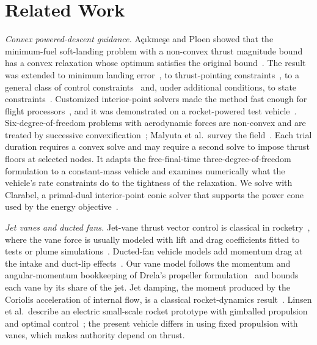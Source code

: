 \documentclass[10pt,letterpaper]{article}
\begin{document}
\section{Related Work}
\label{sec:related}

\textit{Convex powered-descent guidance.}
A\c{c}{\i}kme\c{s}e and Ploen showed that the minimum-fuel soft-landing problem with a non-convex thrust magnitude bound has a convex relaxation whose optimum satisfies the original bound~\cite{acikmese2007}.
The result was extended to minimum landing error~\cite{blackmore2010mle}, to thrust-pointing constraints~\cite{acikmese2013lcvx}, to a general class of control constraints~\cite{acikmese2011lcvx} and, under additional conditions, to state constraints~\cite{harris2014lcvx}.
Customized interior-point solvers made the method fast enough for flight processors~\cite{dueri2017}, and it was demonstrated on a rocket-powered test vehicle~\cite{scharf2017}.
Six-degree-of-freedom problems with aerodynamic forces are non-convex and are treated by successive convexification~\cite{szmuk2018}; Malyuta et al.\ survey the field~\cite{malyuta2022convex}.
Each trial duration requires a convex solve and may require a second solve to impose thrust floors at selected nodes.
It adapts the free-final-time three-degree-of-freedom formulation to a constant-mass vehicle and examines numerically what the vehicle's rate constraints do to the tightness of the relaxation.
We solve with Clarabel, a primal-dual interior-point conic solver that supports the power cone used by the energy objective~\cite{goulart2024clarabel}.

\textit{Jet vanes and ducted fans.}
Jet-vane thrust vector control is classical in rocketry~\cite{sutton2017}, where the vane force is usually modeled with lift and drag coefficients fitted to tests or plume simulations~\cite{sung2004jetvane,liu2013jetvane}.
Ducted-fan vehicle models add momentum drag at the intake and duct-lip effects~\cite{johnson2006ducted,pflimlin2010ducted}.
Our vane model follows the momentum and angular-momentum bookkeeping of Drela's propeller formulation~\cite{drela2006qprop} and bounds each vane by its share of the jet.
Jet damping, the moment produced by the Coriolis acceleration of internal flow, is a classical rocket-dynamics result~\cite{thomson1986}.
Linsen et al.\ describe an electric small-scale rocket prototype with gimballed propulsion and optimal control~\cite{linsen2022}; the present vehicle differs in using fixed propulsion with vanes, which makes authority depend on thrust.
\end{document}
